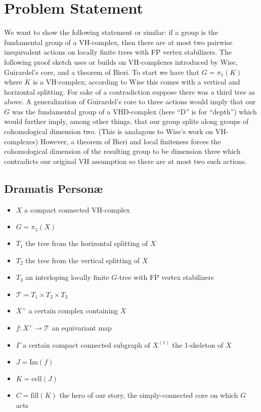\documentclass{article}
\theoremstyle{mystyle}
\theoremstyle{remark}
\begin{document}
\section{Problem Statement}
We want to show the following statement or similar: if a group is the fundamental group of a VH-complex, then there are at most two pairwise inequivalent actions on locally finite trees with FP vertex stabilizers. The following proof sketch uses or builds on VH-complexes introduced by Wise, Guirardel's core, and a theorem of Bieri. To start we have that \(G = \pi_1(K)\) where \(K\) is a VH-complex; according to Wise this comes with a vertical and horizontal splitting. For sake of a contradiction suppose there was a third tree as above. A generalization of Guirardel's core to three actions would imply that our \(G\) was the fundamental group of a VHD-complex (here ``D'' is for ``depth'') which would further imply, among other things, that our group splits along groups of cohomological dimension two. (This is analagous to Wise's work on VH-complexes) However, a theorem of Bieri and local finiteness forces the cohomological dimension of the resulting group to be dimension three which contradicts our original VH assumption so there are at most two such actions.

\subsection{Dramatis Person\ae}
\begin{itemize}
    \item \(X\) a compact connected VH-complex
    \item \(G = \pi_{1} (X)\) 
    \item \(T_{1}\) the tree from the horizontal splitting of \(X\)
    \item \(T_{2}\) the tree from the vertical splitting of \(X\) 
    \item \(T_{3}\) an interloping locally finite \(G\)-tree with FP vertex stabilizers
    \item \(\mathscr{T} = T_{1} \times T_{2} \times T_{3} \) 
    \item \(X^{+}\) a certain complex containing \(X\)
    \item \(f: X^{+} \to \mathscr{T}\) an equivariant map
    \item \(\Gamma \) a certain compact connected subgraph of \(X^{(1)}\) the 1-skeleton of \(X\)
    \item \(J = \text{Im}(f)\) 
    \item \(K = \text{cell}(J)\) 
    \item \(C = \text{fill}(K)\) the hero of our story, the simply-connected core on which \(G\) acts
\end{itemize}
\end{document}
